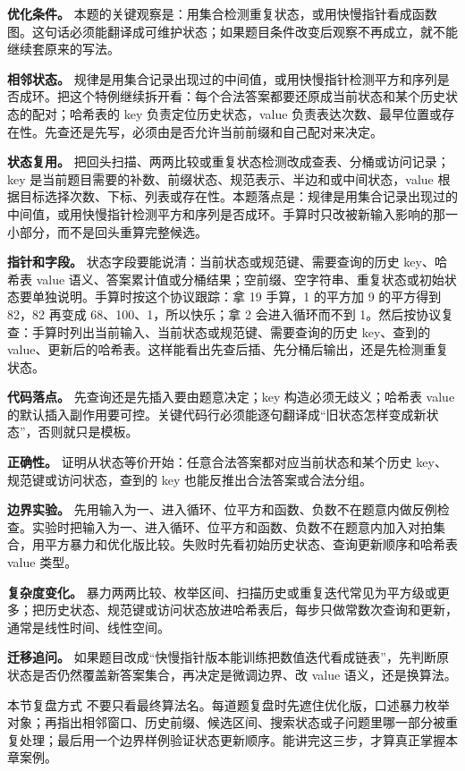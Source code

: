 \textbf{优化条件。} 本题的关键观察是：用集合检测重复状态，或用快慢指针看成函数图。这句话必须能翻译成可维护状态；如果题目条件改变后观察不再成立，就不能继续套原来的写法。

\textbf{相邻状态。} 规律是用集合记录出现过的中间值，或用快慢指针检测平方和序列是否成环。把这个特例继续拆开看：每个合法答案都要还原成当前状态和某个历史状态的配对；哈希表的 key 负责定位历史状态，value 负责表达次数、最早位置或存在性。先查还是先写，必须由是否允许当前前缀和自己配对来决定。

\textbf{状态复用。} 把回头扫描、两两比较或重复状态检测改成查表、分桶或访问记录；key 是当前题目需要的补数、前缀状态、规范表示、半边和或中间状态，value 根据目标选择次数、下标、列表或存在性。本题落点是：规律是用集合记录出现过的中间值，或用快慢指针检测平方和序列是否成环。手算时只改被新输入影响的那一小部分，而不是回头重算完整候选。

\textbf{指针和字段。} 状态字段要能说清：当前状态或规范键、需要查询的历史 key、哈希表 value 语义、答案累计值或分桶结果；空前缀、空字符串、重复状态或初始状态要单独说明。手算时按这个协议跟踪：拿 19 手算，1 的平方加 9 的平方得到 82，82 再变成 68、100、1，所以快乐；拿 2 会进入循环而不到 1。然后按协议复查：手算时列出当前输入、当前状态或规范键、需要查询的历史 key、查到的 value、更新后的哈希表。这样能看出先查后插、先分桶后输出，还是先检测重复状态。

\textbf{代码落点。} 先查询还是先插入要由题意决定；key 构造必须无歧义；哈希表 value 的默认插入副作用要可控。关键代码行必须能逐句翻译成“旧状态怎样变成新状态”，否则就只是模板。

\textbf{正确性。} 证明从状态等价开始：任意合法答案都对应当前状态和某个历史 key、规范键或访问状态，查到的 key 也能反推出合法答案或合法分组。

\textbf{边界实验。} 先用输入为一、进入循环、位平方和函数、负数不在题意内做反例检查。实验时把输入为一、进入循环、位平方和函数、负数不在题意内加入对拍集合，用平方暴力和优化版比较。失败时先看初始历史状态、查询更新顺序和哈希表 value 类型。

\textbf{复杂度变化。} 暴力两两比较、枚举区间、扫描历史或重复迭代常见为平方级或更多；把历史状态、规范键或访问状态放进哈希表后，每步只做常数次查询和更新，通常是线性时间、线性空间。

\textbf{迁移追问。} 如果题目改成“快慢指针版本能训练把数值迭代看成链表”，先判断原状态是否仍然覆盖新答案集合，再决定是微调边界、改 value 语义，还是换算法。

\begin{principlebox}{本节复盘方式}
不要只看最终算法名。每道题复盘时先遮住优化版，口述暴力枚举对象；再指出相邻窗口、历史前缀、候选区间、搜索状态或子问题里哪一部分被重复处理；最后用一个边界样例验证状态更新顺序。能讲完这三步，才算真正掌握本章案例。
\end{principlebox}
